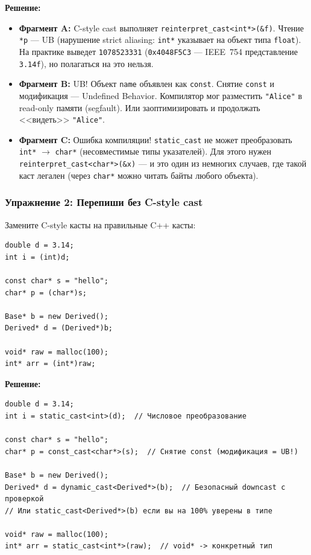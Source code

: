 \documentclass[a4paper,12pt]{article}
\begin{document}
\textbf{Решение:}

\begin{itemize}
    \item \textbf{Фрагмент A:} C-style cast выполняет
          \texttt{reinterpret\_cast<int*>(\&f)}. Чтение \texttt{*p} --- UB
          (нарушение strict aliasing: \texttt{int*} указывает на объект типа
          \texttt{float}). На практике выведет \texttt{1078523331}
          (\texttt{0x4048F5C3} --- IEEE~754 представление \texttt{3.14f}),
          но полагаться на это нельзя.

    \item \textbf{Фрагмент B:} UB! Объект \texttt{name} объявлен как \texttt{const}.
          Снятие \texttt{const} и модификация --- Undefined Behavior. Компилятор мог
          разместить \texttt{"Alice"} в read-only памяти (segfault). Или заоптимизировать
          и продолжать <<видеть>> \texttt{"Alice"}.

    \item \textbf{Фрагмент C:} Ошибка компиляции! \texttt{static\_cast} не может
          преобразовать \texttt{int*} $\to$ \texttt{char*} (несовместимые типы
          указателей). Для этого нужен \texttt{reinterpret\_cast<char*>(\&x)} ---
          и это один из немногих случаев, где такой каст легален (через \texttt{char*}
          можно читать байты любого объекта).
\end{itemize}

\subsubsection{Упражнение 2: Перепиши без C-style cast}

Замените C-style касты на правильные C++ касты:

\begin{lstlisting}
double d = 3.14;
int i = (int)d;

const char* s = "hello";
char* p = (char*)s;

Base* b = new Derived();
Derived* d = (Derived*)b;

void* raw = malloc(100);
int* arr = (int*)raw;
\end{lstlisting}

\textbf{Решение:}

\begin{lstlisting}
double d = 3.14;
int i = static_cast<int>(d);  // Числовое преобразование

const char* s = "hello";
char* p = const_cast<char*>(s);  // Снятие const (модификация = UB!)

Base* b = new Derived();
Derived* d = dynamic_cast<Derived*>(b);  // Безопасный downcast с проверкой
// Или static_cast<Derived*>(b) если вы на 100% уверены в типе

void* raw = malloc(100);
int* arr = static_cast<int*>(raw);  // void* -> конкретный тип
\end{lstlisting}
\end{document}
